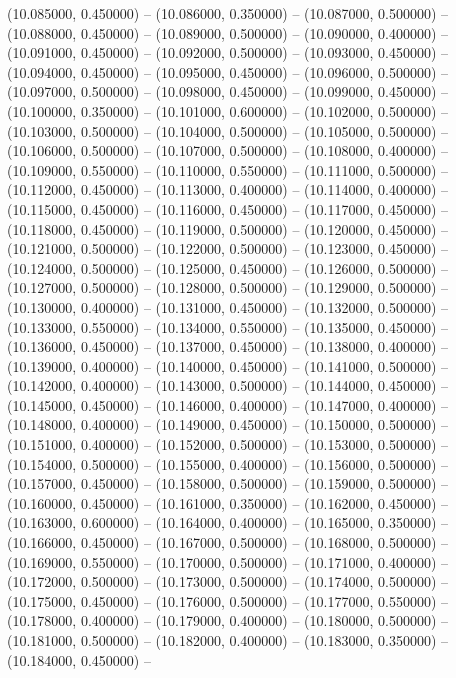 (10.085000, 0.450000) -- 
(10.086000, 0.350000) -- 
(10.087000, 0.500000) -- 
(10.088000, 0.450000) -- 
(10.089000, 0.500000) -- 
(10.090000, 0.400000) -- 
(10.091000, 0.450000) -- 
(10.092000, 0.500000) -- 
(10.093000, 0.450000) -- 
(10.094000, 0.450000) -- 
(10.095000, 0.450000) -- 
(10.096000, 0.500000) -- 
(10.097000, 0.500000) -- 
(10.098000, 0.450000) -- 
(10.099000, 0.450000) -- 
(10.100000, 0.350000) -- 
(10.101000, 0.600000) -- 
(10.102000, 0.500000) -- 
(10.103000, 0.500000) -- 
(10.104000, 0.500000) -- 
(10.105000, 0.500000) -- 
(10.106000, 0.500000) -- 
(10.107000, 0.500000) -- 
(10.108000, 0.400000) -- 
(10.109000, 0.550000) -- 
(10.110000, 0.550000) -- 
(10.111000, 0.500000) -- 
(10.112000, 0.450000) -- 
(10.113000, 0.400000) -- 
(10.114000, 0.400000) -- 
(10.115000, 0.450000) -- 
(10.116000, 0.450000) -- 
(10.117000, 0.450000) -- 
(10.118000, 0.450000) -- 
(10.119000, 0.500000) -- 
(10.120000, 0.450000) -- 
(10.121000, 0.500000) -- 
(10.122000, 0.500000) -- 
(10.123000, 0.450000) -- 
(10.124000, 0.500000) -- 
(10.125000, 0.450000) -- 
(10.126000, 0.500000) -- 
(10.127000, 0.500000) -- 
(10.128000, 0.500000) -- 
(10.129000, 0.500000) -- 
(10.130000, 0.400000) -- 
(10.131000, 0.450000) -- 
(10.132000, 0.500000) -- 
(10.133000, 0.550000) -- 
(10.134000, 0.550000) -- 
(10.135000, 0.450000) -- 
(10.136000, 0.450000) -- 
(10.137000, 0.450000) -- 
(10.138000, 0.400000) -- 
(10.139000, 0.400000) -- 
(10.140000, 0.450000) -- 
(10.141000, 0.500000) -- 
(10.142000, 0.400000) -- 
(10.143000, 0.500000) -- 
(10.144000, 0.450000) -- 
(10.145000, 0.450000) -- 
(10.146000, 0.400000) -- 
(10.147000, 0.400000) -- 
(10.148000, 0.400000) -- 
(10.149000, 0.450000) -- 
(10.150000, 0.500000) -- 
(10.151000, 0.400000) -- 
(10.152000, 0.500000) -- 
(10.153000, 0.500000) -- 
(10.154000, 0.500000) -- 
(10.155000, 0.400000) -- 
(10.156000, 0.500000) -- 
(10.157000, 0.450000) -- 
(10.158000, 0.500000) -- 
(10.159000, 0.500000) -- 
(10.160000, 0.450000) -- 
(10.161000, 0.350000) -- 
(10.162000, 0.450000) -- 
(10.163000, 0.600000) -- 
(10.164000, 0.400000) -- 
(10.165000, 0.350000) -- 
(10.166000, 0.450000) -- 
(10.167000, 0.500000) -- 
(10.168000, 0.500000) -- 
(10.169000, 0.550000) -- 
(10.170000, 0.500000) -- 
(10.171000, 0.400000) -- 
(10.172000, 0.500000) -- 
(10.173000, 0.500000) -- 
(10.174000, 0.500000) -- 
(10.175000, 0.450000) -- 
(10.176000, 0.500000) -- 
(10.177000, 0.550000) -- 
(10.178000, 0.400000) -- 
(10.179000, 0.400000) -- 
(10.180000, 0.500000) -- 
(10.181000, 0.500000) -- 
(10.182000, 0.400000) -- 
(10.183000, 0.350000) -- 
(10.184000, 0.450000) -- 
